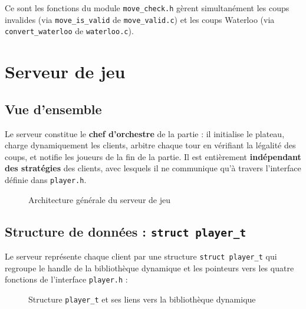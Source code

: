 \documentclass[12pt,a4paper]{article}
\begin{document}
Ce sont les fonctions du module \texttt{move\_check.h} gèrent simultanément les coups invalides (via \texttt{move\_is\_valid} de \texttt{move\_valid.c}) et les coups Waterloo (via \texttt{convert\_waterloo} de \texttt{waterloo.c}).



\section{Serveur de jeu}
\label{sec:serveur}
\subsection{Vue d'ensemble}

Le serveur constitue le \textbf{chef d'orchestre} de la partie : il initialise
le plateau, charge dynamiquement les clients, arbitre chaque tour en vérifiant
la légalité des coups, et notifie les joueurs de la fin de la partie. Il est
entièrement \textbf{indépendant des stratégies} des clients, avec lesquels il
ne communique qu'à travers l'interface définie dans \texttt{player.h}.

\begin{figure}[h]
\centering
\caption{Architecture générale du serveur de jeu}
\end{figure}

\subsection{Structure de données : \texttt{struct player\_t}}

Le serveur représente chaque client par une structure \texttt{struct player\_t}
qui regroupe le handle de la bibliothèque dynamique et les pointeurs vers les
quatre fonctions de l'interface \texttt{player.h} :


\begin{figure}[h]
\centering
\caption{Structure \texttt{player\_t} et ses liens vers la bibliothèque dynamique}
\end{figure}
\end{document}
